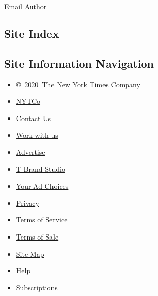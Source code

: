 Email Author

\hypertarget{site-index}{%
\subsection{Site Index}\label{site-index}}

\hypertarget{site-information-navigation}{%
\subsection{Site Information
Navigation}\label{site-information-navigation}}

\begin{itemize}
\tightlist
\item
  \href{https://help.nytimes.com/hc/en-us/articles/115014792127-Copyright-notice}{©~2020~The
  New York Times Company}
\end{itemize}

\begin{itemize}
\tightlist
\item
  \href{https://www.nytco.com/}{NYTCo}
\item
  \href{https://help.nytimes.com/hc/en-us/articles/115015385887-Contact-Us}{Contact
  Us}
\item
  \href{https://www.nytco.com/careers/}{Work with us}
\item
  \href{https://nytmediakit.com/}{Advertise}
\item
  \href{http://www.tbrandstudio.com/}{T Brand Studio}
\item
  \href{https://www.nytimes.com/privacy/cookie-policy\#how-do-i-manage-trackers}{Your
  Ad Choices}
\item
  \href{https://www.nytimes.com/privacy}{Privacy}
\item
  \href{https://help.nytimes.com/hc/en-us/articles/115014893428-Terms-of-service}{Terms
  of Service}
\item
  \href{https://help.nytimes.com/hc/en-us/articles/115014893968-Terms-of-sale}{Terms
  of Sale}
\item
  \href{https://spiderbites.nytimes.com}{Site Map}
\item
  \href{https://help.nytimes.com/hc/en-us}{Help}
\item
  \href{https://www.nytimes.com/subscription?campaignId=37WXW}{Subscriptions}
\end{itemize}
